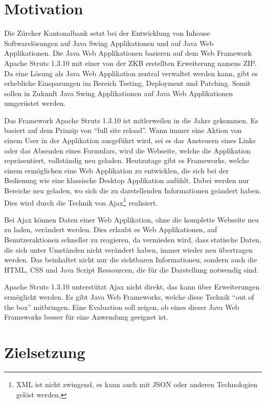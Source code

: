   \section{Motivation}
  
  Die Zürcher Kantonalbank setzt bei der Entwicklung von Inhouse
  Softwarelösungen auf Java Swing Applikationen und auf Java Web Applikationen.
  Die Java Web Applikationen basieren auf dem Web Framework Apache Struts
  1.3.10 mit einer von der ZKB erstellten Erweiterung namens \ac{ZIP}. Da eine
  Lösung als Java Web Applikation zentral verwaltet werden kann, gibt es
  erhebliche Einsparungen im Bereich Testing, Deployment und Patching. Somit
  sollen in Zukunft Java Swing Applikationen auf Java Web Applikationen
  umgerüstet werden.
  
  Das Framework Apache Struts 1.3.10 ist mitlerweilen in die Jahre gekommen. Es
  basiert auf dem Prinzip von ``full site reload''. Wann immer eine Aktion
  von einem User in der Applikation ausgeführt wird, sei es das Ansteuern eines
  Links oder das Absenden eines Formulars, wird die Webseite, welche die
  Applikation repräsentiert, vollständig neu geladen. Heutzutage gibt es
  Frameworks, welche einem ermöglichen eine Web Applikation zu entwicklen, die
  sich bei der Bedienung wie eine klassische Desktop Applikation anfühlt. Dabei
  werden nur Bereiche neu geladen, wo sich die zu darstellenden Informationen
  geändert haben. Dies wird durch die Technik von \ac{Ajax}\footnote{XML ist
  nicht zwingend, es kann auch mit JSON oder anderen Technologien gelöst
  werden.} realisiert.
  
  Bei \ac{Ajax} können Daten einer Web Applikation, ohne die komplette Webseite
  neu zu laden, verändert werden. Dies erlaubt es Web Applikationen, auf
  Benutzeraktionen schneller zu reagieren, da vermieden wird, dass statische
  Daten, die sich unter Umständen nicht verändert haben, immer wieder neu
  übertragen werden. Das beinhaltet nicht nur die sichtbaren Informationen,
  sondern auch die \ac{HTML}, \ac{CSS} und Java Script Ressourcen, die für die
  Darstellung notwendig sind.
  
  Apache Struts 1.3.10 unterstützt \ac{Ajax} nicht direkt, das kann über
  Erweiterungen ermöglicht werden. Es gibt Java Web Frameworks, welche diese
  Technik ``out of the box'' mitbringen. Eine Evaluation soll zeigen, ob eines
  dieser Java Web Frameworks besser für eine Anwendung geeignet ist.
  
  \section{Zielsetzung}
  
